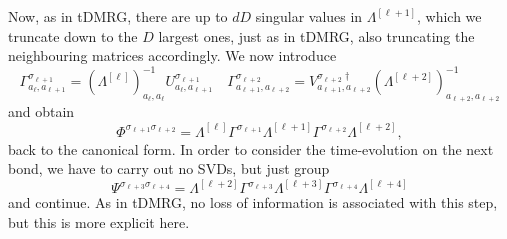 Now, as in tDMRG, there are up to $dD$ singular values in $ \Lambda^{[\ell+1]}$, which we truncate down to the $D$ largest ones, just as in tDMRG, also truncating the neighbouring matrices accordingly. We now introduce
\begin{equation}
\Gamma^{\sigma_{\ell+1}}_{a_\ell,a_{\ell+1}} =  (\Lambda^{[\ell]})^{-1}_{a_\ell,a_\ell} U^{\sigma_{\ell+1}}_{a_\ell,a_{\ell+1}} \quad 
\Gamma^{\sigma_{\ell+2}}_{a_{\ell+1},a_{\ell+2}} =  V^{\sigma_{\ell+2}\dagger}_{a_{\ell+1},a_{\ell+2}} ( \Lambda^{[\ell+2]})^{-1}_{a_{\ell+2},a_{\ell+2}} 
\end{equation}
and obtain
\begin{equation}
\Phi^{\sigma_{\ell+1}\sigma_{\ell+2}} = \Lambda^{[\ell]}  \Gamma^{\sigma_{\ell+1}} 
 \Lambda^{[\ell+1]} \Gamma^{\sigma_{\ell+2}}  \Lambda^{[\ell+2]} ,
\end{equation}
back to the canonical form. In order to consider the time-evolution on the next bond, we have to carry out no SVDs, but just group
\begin{equation}
\Psi^{\sigma_{\ell+3} \sigma_{\ell+4}} = \Lambda^{[\ell+2]}  \Gamma^{\sigma_{\ell+3}} \Lambda^{[\ell+3]}
\Gamma^{\sigma_{\ell+4}} \Lambda^{[\ell+4]}  
\end{equation}
and continue. As in tDMRG, no loss of information is associated with this step, but this is more explicit here.

